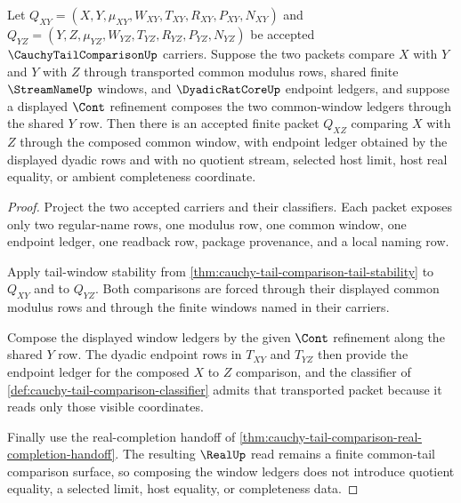 \begin{theorem}
\label{thm:cauchy-tail-comparison-common-window-transitivity}
Let $Q_{XY}=(X,Y,\mu_{XY},W_{XY},T_{XY},R_{XY},P_{XY},N_{XY})$ and $Q_{YZ}=(Y,Z,\mu_{YZ},W_{YZ},T_{YZ},R_{YZ},P_{YZ},N_{YZ})$ be accepted $\CauchyTailComparisonUp$ carriers. Suppose the two packets compare $X$ with $Y$ and $Y$ with $Z$ through transported common modulus rows, shared finite $\StreamNameUp$ windows, and $\DyadicRatCoreUp$ endpoint ledgers, and suppose a displayed $\Cont$ refinement composes the two common-window ledgers through the shared $Y$ row. Then there is an accepted finite packet $Q_{XZ}$ comparing $X$ with $Z$ through the composed common window, with endpoint ledger obtained by the displayed dyadic rows and with no quotient stream, selected host limit, host real equality, or ambient completeness coordinate.
\end{theorem}
\begin{proof}
Project the two accepted carriers and their classifiers. Each packet exposes only two regular-name rows, one modulus row, one common window, one endpoint ledger, one readback row, package provenance, and a local naming row.

Apply tail-window stability from \autoref{thm:cauchy-tail-comparison-tail-stability} to $Q_{XY}$ and to $Q_{YZ}$. Both comparisons are forced through their displayed common modulus rows and through the finite windows named in their carriers.

Compose the displayed window ledgers by the given $\Cont$ refinement along the shared $Y$ row. The dyadic endpoint rows in $T_{XY}$ and $T_{YZ}$ then provide the endpoint ledger for the composed $X$ to $Z$ comparison, and the classifier of \autoref{def:cauchy-tail-comparison-classifier} admits that transported packet because it reads only those visible coordinates.

Finally use the real-completion handoff of \autoref{thm:cauchy-tail-comparison-real-completion-handoff}. The resulting $\RealUp$ read remains a finite common-tail comparison surface, so composing the window ledgers does not introduce quotient equality, a selected limit, host equality, or completeness data.
\end{proof}

